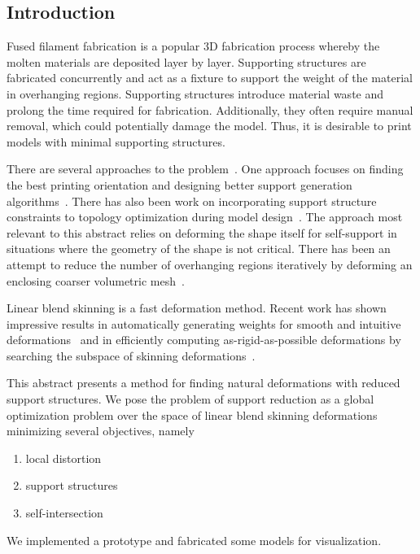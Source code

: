 
\subsection*{Introduction}

Fused filament fabrication is a popular 3D fabrication process whereby the molten materials are deposited layer by layer. Supporting structures are fabricated concurrently and act as a fixture to support the weight of the material in overhanging regions. Supporting structures introduce material waste and prolong the time required for fabrication. Additionally, they often require manual removal, which could potentially damage the model. Thus, it is desirable to print models with minimal supporting structures.

There are several approaches to the problem~\cite{jiang_xu_stringer_2018}. One approach focuses on finding the best printing orientation and designing better support generation algorithms~\cite{vanek_galicia_benes_2014}. There has also been work on incorporating support structure constraints to topology optimization during model design~\cite{langelaar_2016}. The approach most relevant to this abstract relies on deforming the shape itself for self-support in situations where the geometry of the shape is not critical. There has been an attempt to reduce the number of overhanging regions iteratively by deforming an enclosing coarser volumetric mesh~\cite{hu_jin_wang_2015}.

Linear blend skinning is a fast deformation method. Recent work has shown impressive results in automatically generating weights for smooth and intuitive deformations~\cite{jacobson_bounded_biharmonic_weights_2011} and in efficiently computing as-rigid-as-possible deformations by searching the subspace of skinning deformations~\cite{jacobson_fast_2012}.

This abstract presents a method for finding natural deformations with reduced support structures. We pose the problem of support reduction as a global optimization problem over the space of linear blend skinning deformations minimizing several objectives, namely
\begin{enumerate}
    \item local distortion ~\cite{sorkine_arap_2007}
    \item support structures
    \item self-intersection
\end{enumerate}
We implemented a prototype and fabricated some models for visualization.

